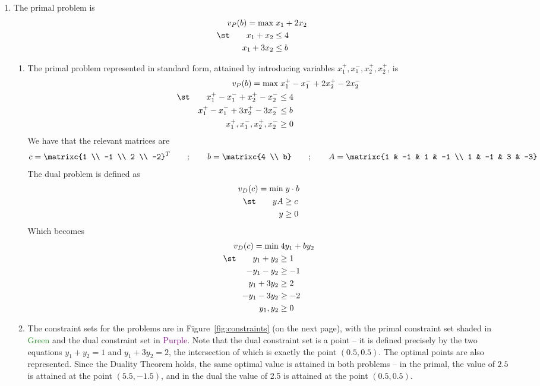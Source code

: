 \documentclass[10pt]{article}
\begin{document}
\begin{enumerate}
	\item The primal problem is \begin{align*} v_P(b) = \max &\;x_1 + 2x_2 \\ \st \qquad x_1 + x_2 &\le 4 \\ x_1 + 3x_2 &\le b \end{align*} \begin{enumerate} \item The primal problem represented in standard form, attained by introducing variables $x_1^+,x_1^-,x_2^+,x_2^+$, is \begin{align*} v_P(b) = \max &\; x_1^+ - x_1^- + 2x_2^+ - 2x_2^- \\ \st \qquad x_1^+ - x_1^- + x_2^+ - x_2^- &\le 4 \\ x_1^+ - x_1^- + 3x_2^+ - 3x_2^- &\le b \\ x_1^+,x_1^-,x_2^+,x_2^- &\ge 0 \end{align*} We have that the relevant matrices are \[c = \matrixc{1 \\ -1 \\ 2 \\ -2}^T \qquad ; \qquad b = \matrixc{4 \\ b} \qquad ; \qquad A = \matrixc{1 & -1 & 1 & -1 \\ 1 & -1 & 3 & -3}\] The dual problem is defined as \begin{align*} v_D(c) = \min&\; y \cdot b \\ \st \qquad yA &\ge c \\ y &\ge 0 \end{align*}Which becomes \begin{align*} v_D(c) = \min &\; 4y_1 + by_2 \\ \st \qquad y_1 + y_2 &\ge 1 \\ -y_1 - y_2 &\ge -1 \\ y_1 + 3y_2 &\ge 2 \\ -y_1 - 3y_2 &\ge -2 \\ y_1,y_2 &\ge 0\end{align*} \item The constraint sets for the problems are in Figure~\ref{fig:constraints} (on the next page), with the primal constraint set shaded in \textcolor{ForestGreen}{Green} and the dual constraint set in \textcolor{Purple}{Purple}. Note that the dual constraint set is a point -- it is defined precisely by the two equations $y_1+y_2 = 1$ and $y_1 + 3y_2 = 2$, the intersection of which is exactly the point $(0.5,0.5)$. The optimal points are also represented. Since the Duality Theorem holds, the same optimal value is attained in both problems -- in the primal, the value of $2.5$ is attained at the point $(5.5,-1.5)$, and in the dual the value of 2.5 is attained at the point $(0.5,0.5)$.
	

\end{enumerate}
\end{enumerate}
\end{document}
